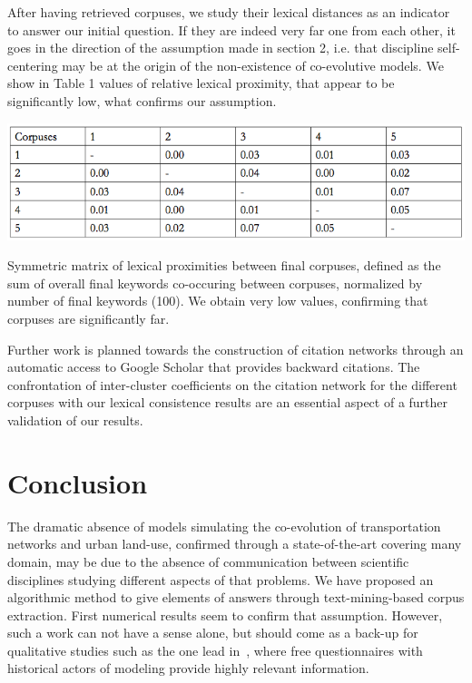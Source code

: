 After having retrieved corpuses, we study their lexical distances as an indicator to answer our initial question. If they are indeed very far one from each other, it goes in the direction of the assumption made in section 2, i.e. that discipline self-centering may be at the origin of the non-existence of co-evolutive models. We show in Table 1 values of relative lexical proximity, that appear to be significantly low, what confirms our assumption.

\begin{table}
\centering
\includegraphics[width=\textwidth]{corpusesMatrix}
\caption{Symmetric matrix of lexical proximities between final corpuses, defined as the sum of overall final keywords co-occuring between corpuses, normalized by number of final keywords (100). We obtain very low values, confirming that corpuses are significantly far.}
\label{tab:res}
\end{table}


Further work is planned towards the construction of citation networks through an automatic access to Google Scholar that provides backward citations. The confrontation of inter-cluster coefficients on the citation network for the different corpuses with our lexical consistence results are an essential aspect of a further validation of our results.



\section{Conclusion}

The dramatic absence of models simulating the co-evolution of transportation networks and urban land-use, confirmed through a state-of-the-art covering many domain, may be due to the absence of communication between scientific disciplines studying different aspects of that problems. We have proposed an algorithmic method to give elements of answers through text-mining-based corpus extraction. First numerical results seem to confirm that assumption. However, such a work can not have a sense alone, but should come as a back-up for qualitative studies such as the one lead in~\cite{commenges:tel-00923682}, where free questionnaires with historical actors of modeling provide highly relevant information.



\small






